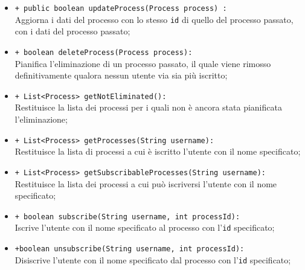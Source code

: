 \begin{flushleft}
\begin{itemize}
\begin{sloppypar}
\begin{itemize}
\item \texttt{+ public boolean updateProcess(Process process) :}\\ Aggiorna i dati del processo con lo stesso \texttt{id} di quello del processo passato, con i dati del processo passato;
\item \texttt{+ boolean deleteProcess(Process process):}\\ Pianifica l'eliminazione di un processo passato, il quale viene rimosso definitivamente qualora nessun utente via sia più iscritto;
\item \texttt{+ List<Process> getNotEliminated():}\\ Restituisce la lista dei processi per i quali non è ancora stata pianificata l'eliminazione;
\item \texttt{+ List<Process> getProcesses(String username): }\\ Restituisce la lista di processi a cui è iscritto l'utente con il nome specificato;
\item \texttt{+ List<Process> getSubscribableProcesses(String username):}\\ Restituisce la lista dei processi a cui può iscriversi l'utente con il nome specificato;
\item \texttt{+ boolean subscribe(String username, int processId):}\\ Iscrive l'utente con il nome specificato al processo con l'\texttt{id} specificato;
\item \texttt{+boolean unsubscribe(String username, int processId):}\\ Disiscrive l'utente con il nome specificato dal processo con l'\texttt{id} specificato;
\end{itemize}
\end{sloppypar}
\end{itemize}
\end{flushleft}

